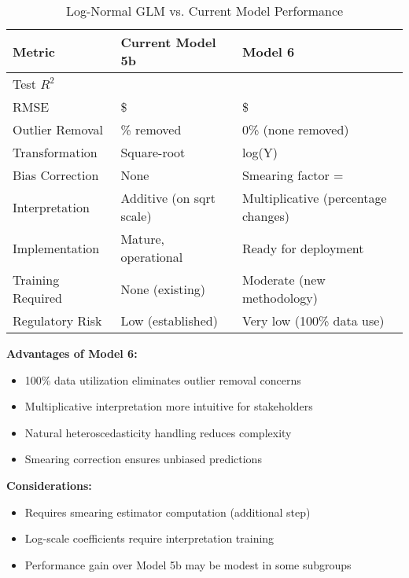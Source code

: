 \begin{table}[h]
\centering
\caption{Log-Normal GLM vs. Current Model Performance}
\begin{tabular}{lll}
\toprule
\textbf{Metric} & \textbf{Current Model 5b} & \textbf{Model 6} \\
\midrule
Test $R^2$ & \ModelOneFiveBRSquaredTwoThousandFifteen{} & \MRSquaredTest{} \\
RMSE & \$\ModelOneFiveBRMSETwoThousandFifteen{} & \$\MRMSETest{} \\
Outlier Removal & \ModelOneFiveBOutlierPctTwoThousandFifteen{}\% removed & 0\% (none removed) \\
Transformation & Square-root & log(Y) \\
Bias Correction & None & Smearing factor = \ModelSixSmearingFactor{} \\
Interpretation & Additive (on sqrt scale) & Multiplicative (percentage changes) \\
Implementation & Mature, operational & Ready for deployment \\
Training Required & None (existing) & Moderate (new methodology) \\
Regulatory Risk & Low (established) & Very low (100\% data use) \\
\bottomrule
\end{tabular}
\end{table}

\textbf{Advantages of Model 6:}
\begin{itemize}
    \item 100\% data utilization eliminates outlier removal concerns
    \item Multiplicative interpretation more intuitive for stakeholders
    \item Natural heteroscedasticity handling reduces complexity
    \item Smearing correction ensures unbiased predictions
\end{itemize}

\textbf{Considerations:}
\begin{itemize}
    \item Requires smearing estimator computation (additional step)
    \item Log-scale coefficients require interpretation training
    \item Performance gain over Model 5b may be modest in some subgroups
\end{itemize}


